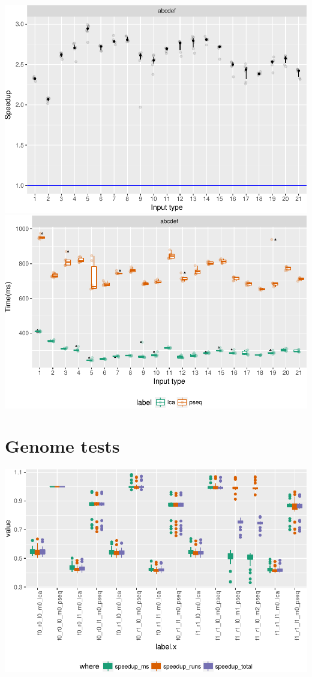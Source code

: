 \documentclass[]{article}
\begin{document}
\includegraphics{sea_2018_files/figure-latex/unnamed-chunk-2-1.pdf}
\includegraphics{sea_2018_files/figure-latex/unnamed-chunk-2-2.pdf}

\section{Genome tests}\label{genome-tests}

\includegraphics{sea_2018_files/figure-latex/genome-tests-1.pdf}
\end{document}
